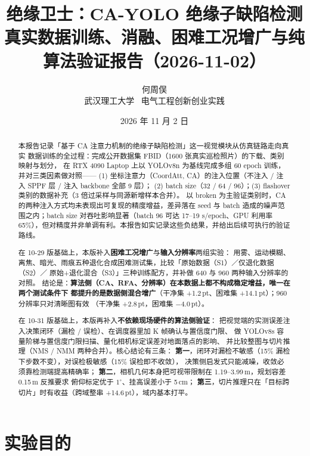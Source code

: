\documentclass[UTF8,a4paper,11pt]{ctexart}
\title{\textbf{绝缘卫士：CA-YOLO 绝缘子缺陷检测}\\[0.4em]
\large 真实数据训练、消融、困难工况增广与纯算法验证报告（2026-11-02）}
\author{何周俣\\武汉理工大学 \, 电气工程创新创业实践}
\date{2026 年 11 月 2 日}
\begin{document}
\maketitle

\begin{abstract}
\noindent 本报告记录「基于 CA 注意力机制的绝缘子缺陷检测」这一视觉模块从仿真链路走向真实
数据训练的全过程：完成公开数据集 FBID（1600 张真实巡检照片）的下载、类别映射与划分，
在 RTX 4090 Laptop 上以 YOLOv8n 为基线完成多组 60 epoch 训练，并对三类因素做对照——
(1) 坐标注意力（CoordAtt, CA）的注入位置（不注入 / 注入 SPPF 层 / 注入 backbone 全部 9 层）；
(2) batch size（32 / 64 / 96）；(3) flashover 类别的数据补充（3 倍过采样与同源新增样本合并）。
以 broken 为主验证类别时，CA 的两种注入方式均未表现出可复现的精度增益，差异落在 seed 与
batch 造成的噪声范围之内；batch size 对吞吐影响显著（batch 96 可达 17--19 s/epoch、GPU
利用率 65\%），但对精度并非单调有利。本报告如实记录这些负结果，并给出后续可执行的验证路线。

\vspace{0.6em}
\noindent 在 10-29 版基础上，本版补入\textbf{困难工况增广}与\textbf{输入分辨率}两组实验：
用雾、运动模糊、离焦、暗光、雨痕五种退化合成困难测试集，比较「原始数据（S1）／仅退化数据（S2）／
原始+退化混合（S3）」三种训练配方，并补做 640 与 960 两种输入分辨率的对照。
结论是：\textbf{算法侧（CA、RFA、分辨率）在本数据上都不构成稳定增益，唯一在两个测试条件下
都提升的是数据侧混合增广}（干净集 +1.2\,pt、困难集 +14.1\,pt）；960 分辨率只对清晰图有效
（干净集 +2.8\,pt，困难集 $-4.0$\,pt）。

\vspace{0.6em}
\noindent 在 10-31 版基础上，本版再补入\textbf{不依赖现场硬件的算法侧验证}：
把视觉端的实测误差注入决策闭环（漏检 / 误检）、在调度器里加 K 帧确认与置信度门限、
做 YOLOv8s 容量阶梯与置信度门限扫描、量化相机标定误差对地面落点的影响、
并比较整图与切片推理（NMS / NMM 两种合并）。核心结论有三条：
\textbf{第一}，闭环对漏检不敏感（15\% 漏检下步数不变），对误检极敏感（15\% 误检即不收敛），
决策侧启发式只能减噪，收敛必须靠检测端提高精确率；
\textbf{第二}，相机几何本身把可视带限制在 1.19--3.99\,m，规划容差 0.15\,m 反推要求
俯仰标定优于 $1^\circ$、挂高误差小于 5\,cm；
\textbf{第三}，切片推理只在「目标跨切片」时有收益（跨域整串 +14.6\,pt），域内基本打平。
\end{abstract}

\section{实验目的}
\end{document}

